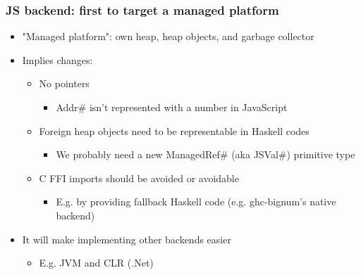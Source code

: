 \documentclass[aspectratio=169]{beamer}
\begin{document}
\begin{frame}
\frametitle{JS backend: first to target a managed platform}
\begin{itemize}
\item "Managed platform": own heap, heap objects, and garbage collector
\item Implies changes:
\begin{itemize}
\item No pointers
\begin{itemize}
\item Addr\# isn't represented with a number in JavaScript
\end{itemize}
\item Foreign heap objects need to be representable in Haskell codes
\begin{itemize}
  \item We probably need a new ManagedRef\# (aka JSVal\#) primitive type
\end{itemize}
\item C FFI imports should be avoided or avoidable
\begin{itemize}
\item E.g. by providing fallback Haskell code (e.g. ghc-bignum's native backend)
\end{itemize}
\end{itemize}
\item It will make implementing other backends easier
\begin{itemize}
\item E.g. JVM and CLR (.Net)
\end{itemize}
\end{itemize}
\end{frame}
\end{document}
